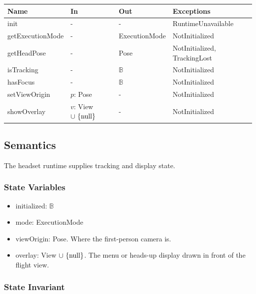 \documentclass[12pt, titlepage]{article}
\newcommand{\nul}{\textnormal{null}}
\begin{document}
\begin{center}
\begin{minipage}{\textwidth}
\begin{tabularx}{\textwidth}{p{3.5cm} p{2.45cm} p{2.85cm} X}
\toprule
\textbf{Name} & \textbf{In} & \textbf{Out} & \textbf{Exceptions} \\
\midrule
init & - & - & RuntimeUnavailable \\
getExecutionMode & - & ExecutionMode & NotInitialized \\
getHeadPose & - & Pose & NotInitialized, TrackingLost \\
isTracking & - & $\mathbb{B}$ & NotInitialized \\
hasFocus & - & $\mathbb{B}$ & NotInitialized \\
setViewOrigin & $p$: Pose & - & NotInitialized \\
showOverlay & $v$: View $\cup \ \{\nul\}$ & - & NotInitialized \\
\bottomrule
\end{tabularx}
\label{TblM1Access}
\end{minipage}
\end{center}

\subsection{Semantics}

The headset runtime supplies tracking and display state.

\subsubsection{State Variables}

\begin{itemize}
\item initialized: $\mathbb{B}$
\item mode: ExecutionMode
\item viewOrigin: Pose. Where the first-person camera is.
\item overlay: View $\cup \ \{\nul\}$. The menu or heads-up display drawn in
  front of the flight view.
\end{itemize}

\subsubsection{State Invariant}
\end{document}

